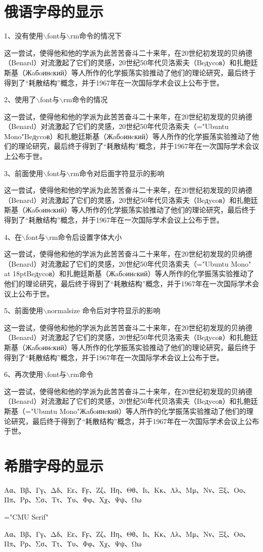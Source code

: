 \documentclass[UTF8,a4paper]{ctexart}
\begin{document}
\section{俄语字母的显示}
1、没有使用$\backslash$font与$\backslash$rm命令的情况下

这一尝试，使得他和他的学派为此苦苦奋斗二十来年，在20世纪初发现的贝纳德（Benard）对流激起了它们的灵感，20世纪50年代贝洛索夫（Beдycoв）和扎鲍廷斯基（Жaбoинcкий）等人所作的化学振荡实验推动了他们的理论研究，最后终于得到了“耗散结构”概念，并于1967年在一次国际学术会议上公布于世。

2、使用了$\backslash$font与$\backslash$rm命令的情况

这一尝试，使得他和他的学派为此苦苦奋斗二十来年，在20世纪初发现的贝纳德（Benard）对流激起了它们的灵感，20世纪50年代贝洛索夫（\font\rm="Ubuntu Mono"\rm Beдycoв）和扎鲍廷斯基（Жaбoинcкий）等人所作的化学振荡实验推动了他们的理论研究，最后终于得到了“耗散结构”概念，并于1967年在一次国际学术会议上公布于世。

3、前面使用$\backslash$font与$\backslash$rm命令对后面字符显示的影响

这一尝试，使得他和他的学派为此苦苦奋斗二十来年，在20世纪初发现的贝纳德（Benard）对流激起了它们的灵感，20世纪50年代贝洛索夫（Beдycoв）和扎鲍廷斯基（Жaбoинcкий）等人所作的化学振荡实验推动了他们的理论研究，最后终于得到了“耗散结构”概念，并于1967年在一次国际学术会议上公布于世。

4、在$\backslash$font与$\backslash$rm命令后设置字体大小

这一尝试，使得他和他的学派为此苦苦奋斗二十来年，在20世纪初发现的贝纳德（Benard）对流激起了它们的灵感，20世纪50年代贝洛索夫（\font\rm="Ubuntu Mono" at 18pt\rm Beдycoв）和扎鲍廷斯基（Жaбoинcкий）等人所作的化学振荡实验推动了他们的理论研究，最后终于得到了“耗散结构”概念，并于1967年在一次国际学术会议上公布于世。\normalsize

5、前面使用$\backslash$normalsize 命令后对字符显示的影响

这一尝试，使得他和他的学派为此苦苦奋斗二十来年，在20世纪初发现的贝纳德（Benard）对流激起了它们的灵感，20世纪50年代贝洛索夫（Beдycoв）和扎鲍廷斯基（Жaбoинcкий）等人所作的化学振荡实验推动了他们的理论研究，最后终于得到了“耗散结构”概念，并于1967年在一次国际学术会议上公布于世。

6、再次使用$\backslash$font与$\backslash$rm命令

这一尝试，使得他和他的学派为此苦苦奋斗二十来年，在20世纪初发现的贝纳德（Benard）对流激起了它们的灵感，20世纪50年代贝洛索夫（Beдycoв）和扎鲍廷斯基（\font\rm="Ubuntu Mono"\rm Жaбoинcкий）等人所作的化学振荡实验推动了他们的理论研究，最后终于得到了“耗散结构”概念，并于1967年在一次国际学术会议上公布于世。



\section{希腊字母的显示}
\normalsize

Αα、Ββ、Γγ、Δδ、Εε、Ϝϝ、Ζζ、Ηη、Θθ、Ιι、Κκ、Λλ、Μμ、Νν、Ξξ、Οο、Ππ、Ρρ、Σσ、Ττ、Υυ、Φφ、Χχ、Ψψ、Ωω

\font\rm="CMU Serif"\rm 

Αα、Ββ、Γγ、Δδ、Εε、Ϝϝ、Ζζ、Ηη、Θθ、Ιι、Κκ、Λλ、Μμ、Νν、Ξξ、Οο、Ππ、Ρρ、Σσ、Ττ、Υυ、Φφ、Χχ、Ψψ、Ωω
\end{document}
